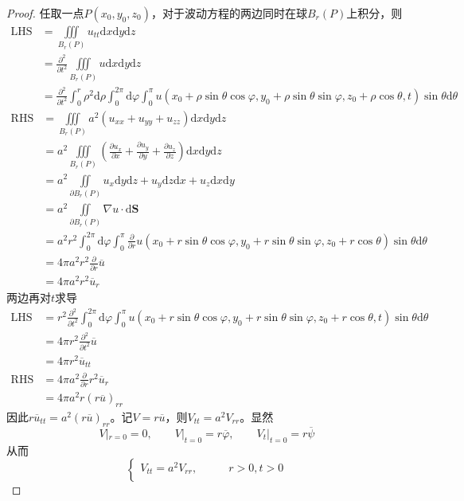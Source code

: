 \documentclass[lang = cn, scheme = chinese, thmcnt = section]{elegantbook}
\newcommand{\bs}{\boldsymbol}          %
\newcommand{\dd}{\mathrm{d}}           %
\newcommand{\IInt}{\iint\limits}
\newcommand{\IIInt}{\iiint\limits}
\begin{document}
\begin{proof}
	任取一点$P(x_0,y_0,z_0)$，对于波动方程的两边同时在球$B_r(P)$上积分，则
	\begin{align*}
		\text{LHS}
		& = \IIInt_{B_r(P)}u_{tt}\dd x\dd y \dd z\\
		& = \frac{\partial^2}{\partial t^2}\IIInt_{B_r(P)}u\dd x\dd y \dd z\\
		& = \frac{\partial^2}{\partial t^2}\int_{0}^{r}\rho^2\dd\rho\int_{0}^{2\pi}\dd\varphi\int_{0}^{\pi}u(x_0+\rho\sin\theta\cos\varphi,y_0+\rho\sin\theta\sin\varphi,z_0+\rho\cos\theta,t)\sin\theta\dd\theta
	\end{align*}
	\begin{align*}
		\text{RHS}
		& = \IIInt_{B_r(P)}a^2(u_{xx}+u_{yy}+u_{zz})\dd x\dd y \dd z\\
		& =  a^2\IIInt_{B_r(P)}\left(\frac{\partial u_x}{\partial x}+\frac{\partial u_y}{\partial y}+\frac{\partial u_z}{\partial z}\right)\dd x\dd y \dd z\\
		& = a^2\IInt_{\partial B_r(P)}u_x\dd y\dd z+u_y\dd z\dd x+u_z\dd x\dd y\\
		& = a^2\IInt_{\partial B_r(P)}\nabla u\cdot\dd\bs{S}\\
		& = a^2r^2\int_{0}^{2\pi}\dd\varphi\int_{0}^{\pi}\frac{\partial}{\partial r}u(x_0+r\sin\theta\cos\varphi,y_0+r\sin\theta\sin\varphi,z_0+r\cos\theta)\sin\theta\dd\theta\\
		& = 4\pi a^2r^2\frac{\partial}{\partial r}\overline{u}\\
		& = 4\pi a^2r^2\overline{u}_r
	\end{align*}
	两边再对$t$求导
	\begin{align*}
		\text{LHS}
		& = r^2\frac{\partial^2}{\partial t^2}\int_{0}^{2\pi}\dd\varphi\int_{0}^{\pi}u(x_0+r\sin\theta\cos\varphi,y_0+r\sin\theta\sin\varphi,z_0+r\cos\theta,t)\sin\theta\dd\theta\\
		& = 4\pi r^2\frac{\partial^2}{\partial t^2}\overline{u}\\
		& = 4\pi r^2\overline{u}_{tt}\\
		\text{RHS}
		& = 4\pi a^2\frac{\partial}{\partial r}r^2\overline{u}_r\\
		& = 4\pi a^2 r(r\overline{u})_{rr}
	\end{align*}
	因此$r\overline{u}_{tt}=a^2(r\overline{u})_{rr}$。记$V=r\overline{u}$，则$V_{tt}=a^2V_{rr}$。显然%
	$$
	V|_{r=0}=0,\qquad 
	V|_{t=0}=r\overline{\varphi},\qquad 
	V_t|_{t=0}=r\overline{\psi}
	$$
	从而%
	$$
	\begin{cases}
		V_{tt}=a^2V_{rr},\qquad & r>0,t>0\\

\end{cases}$$
\end{proof}
\end{document}
